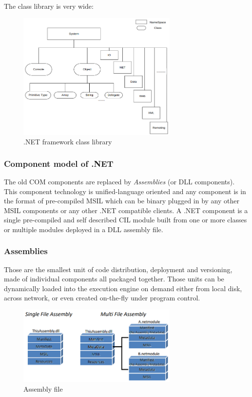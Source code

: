 The class library is very wide:
\begin{figure}[H]
    \centering
    \includegraphics[width=300px]{images/3_Software_Components/.NET_class_library.png}
    \caption{.NET framework class library}
\end{figure}

\subsubsection{Component model of .NET}
The old COM components are replaced by \emph{Assemblies} (or DLL components).
This component technology is unified-language oriented and any component is in the format of pre-compiled MSIL which can be binary plugged in by any other MSIL components or any other .NET compatible clients.
A .NET component is a single pre-compiled and self described CIL module built from one or more classes or multiple modules deployed in a DLL assembly file.

\subsubsection{Assemblies}
Those are the smallest unit of code distribution, deployment and versioning, made of individual components all packaged together.
Those units can be dynamically loaded into the execution engine on demand either from local disk, across network, or even created on-the-fly under program control.

\begin{figure}[H]
    \centering
    \includegraphics[width=300px]{images/3_Software_Components/assembly_file.png}
    \caption{Assembly file}
\end{figure}

